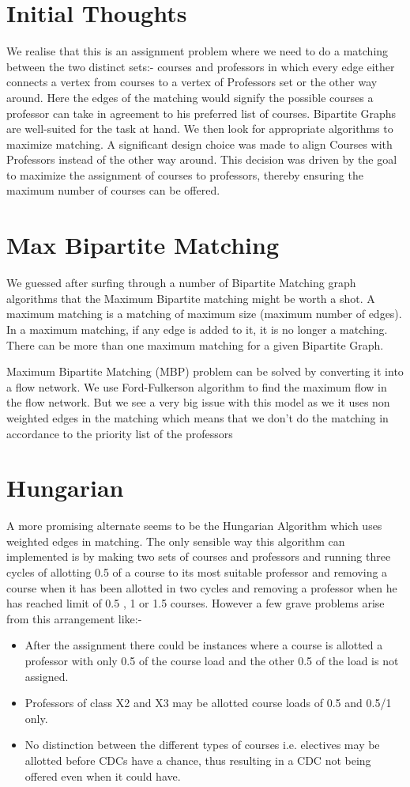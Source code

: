 \documentclass[12pt, letterpaper]{article}
\begin{document}
\section{Initial Thoughts}
We realise that this is an assignment problem where we need to do a matching between the two distinct sets:- courses and professors in which every edge either connects a vertex from courses to a vertex of Professors set or the other way around. Here the edges of the matching would signify the possible courses a professor can take in agreement to his preferred list of courses.  Bipartite Graphs are well-suited for the task at hand. We then look for appropriate algorithms to maximize matching. A significant design choice was made to align Courses with Professors instead of the other way around. This decision was driven by the goal to maximize the assignment of courses to professors, thereby ensuring the maximum number of courses can be offered.
\section{Max Bipartite Matching}
We guessed after surfing through a number of Bipartite Matching graph algorithms that the Maximum Bipartite matching might be worth a shot. A maximum matching is a matching of maximum size (maximum number of edges). In a maximum matching, if any edge is added to it, it is no longer a matching. There can be more than one maximum matching for a given Bipartite Graph. 

Maximum Bipartite Matching (MBP) problem can be solved by converting it into a flow network. We use Ford-Fulkerson algorithm to find the maximum flow in the flow network. But we see a very big issue with this model as we it uses non weighted edges in the matching which means that we don’t do the matching in accordance to the priority list of the professors
\section{Hungarian}
A more promising alternate seems to be the Hungarian Algorithm which uses weighted edges in matching. The only sensible way this algorithm can implemented is by making two sets of courses and professors and running three cycles of allotting 0.5 of a course to its most suitable professor and removing a course when it has been allotted in two cycles and removing a professor when he has reached limit of 0.5 , 1 or 1.5 courses. However a few grave problems arise from this arrangement like:-
\begin{itemize}
\item After the assignment there could be instances where a course is allotted a professor with only 0.5 of the course load and the other 0.5 of the load is not assigned. 
\item Professors of class X2 and X3 may be allotted course loads of 0.5 and 0.5/1 only.
\item No distinction between the different types of courses i.e. electives may be allotted before CDCs have a chance, thus resulting in a CDC not being offered even when it could have.
\end{itemize}
\end{document}
